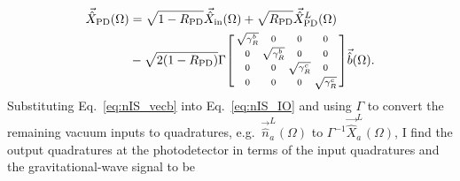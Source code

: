\begin{align}
\label{eq:nIS_IO}
\vec{\hat X}_\mathrm{PD}(\Omega)&=\sqrt{1-R_\text{PD}}\vec{\hat X}_\mathrm{in}(\Omega)+\sqrt{R_\text{PD}}\vec{\hat X}^L_\text{PD}(\Omega)\nonumber\\
&-\sqrt{2(1-R_\text{PD})}\Gamma\begin{bsmallmatrix}
\sqrt{\gamma^b_R} & 0 & 0 & 0 \\
0 & \sqrt{\gamma^b_R} & 0 & 0 \\
0 & 0 & \sqrt{\gamma^c_R} & 0 \\
0 & 0 & 0 & \sqrt{\gamma^c_R}
\end{bsmallmatrix}\vec{\hat b}(\Omega).
\end{align}
Substituting Eq.~\ref{eq:nIS_vecb} into Eq.~\ref{eq:nIS_IO} and using $\Gamma$ to convert the remaining vacuum inputs to quadratures, e.g.\ $\vec{\hat{n}}^L_a(\Omega)$ to $\Gamma^{-1}\vec{\hat X}^L_a(\Omega)$, I find the output quadratures at the photodetector in terms of the input quadratures and the gravitational-wave signal to be
\begingroup
\allowdisplaybreaks
